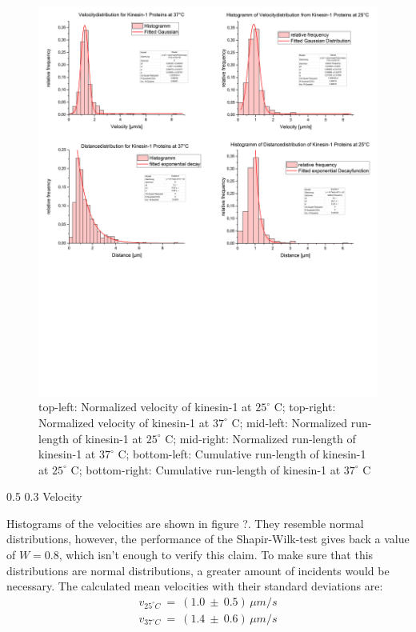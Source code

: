 \documentclass[english, %
parskip=full, %
bibliography=totoc, %
]{scrartcl}
\makeatletter
\renewcommand\subsection{\@startsection 
   {subsection}{2}{0mm}%
   {0.5\baselineskip}%
   {0.3\baselineskip}%
   {\bfseries\sffamily\large}%
   }
\makeatother
\begin{document}
\begin{figure}[p] 
  \centering
     \includegraphics[width=1.0\textwidth]{all_diagrams.png}
  \caption{top-left: Normalized velocity of kinesin-1 at $25^\circ$ C; top-right: Normalized velocity of kinesin-1 at $37^\circ$ C; mid-left: Normalized run-length of kinesin-1 at $25^\circ$ C; mid-right: Normalized run-length of kinesin-1 at $37^\circ$ C; bottom-left: Cumulative run-length of kinesin-1 at $25^\circ$ C; bottom-right: Cumulative run-length of kinesin-1 at $37^\circ$ C}
\end{figure}

\subsection{Velocity}

Histograms of the velocities are shown in figure ?. They resemble normal distributions, however, the performance of the Shapir-Wilk-test gives back a value of $W = 0.8$, which isn't enough to verify this claim. To make sure that this distributions are normal distributions, a greater amount of incidents would be necessary.  The calculated mean velocities with their standard deviations are:
\begin{align*}
v _{25^\circ C} \ = \ (1.0 \ \pm \ 0.5) \, \mu m/s \\
v _{37^\circ C} \ = \ (1.4 \ \pm \ 0.6) \, \mu m/s
\end{align*}
\end{document}
